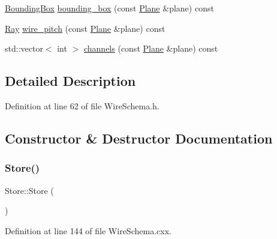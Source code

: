 \begin{DoxyCompactItemize}
\item 
\hyperlink{class_wire_cell_1_1_bounding_box}{Bounding\+Box} \hyperlink{class_wire_cell_1_1_wire_schema_1_1_store_a518ea3cec1822b41022594933ccd31b2}{bounding\+\_\+box} (const \hyperlink{struct_wire_cell_1_1_wire_schema_1_1_plane}{Plane} \&plane) const
\item 
\hyperlink{namespace_wire_cell_a3ab20d9b438feb7eb1ffaab9ba98af0c}{Ray} \hyperlink{class_wire_cell_1_1_wire_schema_1_1_store_abc4cbd21498604e65dbb8753a437a2c2}{wire\+\_\+pitch} (const \hyperlink{struct_wire_cell_1_1_wire_schema_1_1_plane}{Plane} \&plane) const
\item 
std\+::vector$<$ int $>$ \hyperlink{class_wire_cell_1_1_wire_schema_1_1_store_a70cdc99b1fa1d6e58359e5d0d7c9ad48}{channels} (const \hyperlink{struct_wire_cell_1_1_wire_schema_1_1_plane}{Plane} \&plane) const
\end{DoxyCompactItemize}


\subsection{Detailed Description}


Definition at line 62 of file Wire\+Schema.\+h.



\subsection{Constructor \& Destructor Documentation}
\mbox{\label{class_wire_cell_1_1_wire_schema_1_1_store_a5f58eadcb7385d5a5aa6830daef84f7d}} 
\subsubsection{\texorpdfstring{Store()}{Store()}\hspace{0.1cm}{\footnotesize\ttfamily [1/3]}}
{\footnotesize\ttfamily Store\+::\+Store (\begin{DoxyParamCaption}{ }\end{DoxyParamCaption})}



Definition at line 144 of file Wire\+Schema.\+cxx.

\mbox{\label{class_wire_cell_1_1_wire_schema_1_1_store_abedb7f146845049bdd5963be7838d6ec}} 
